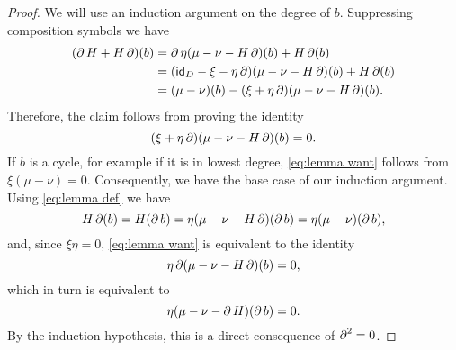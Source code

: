 \begin{proof}
	We will use an induction argument on the degree of $b$.
	Suppressing composition symbols we have
	\begin{align*}
		(\operatorname{\partial} H + H \operatorname{\partial})(b)
		&= \operatorname{\partial} \eta(\mu - \nu - H \operatorname{\partial})(b) + H \operatorname{\partial} (b) \\
		&= (\mathsf{id}_D - \xi - \eta \operatorname{\partial})(\mu - \nu - H \operatorname{\partial})(b) + H \operatorname{\partial}(b) \\
		&= (\mu-\nu)(b) - (\xi + \eta \operatorname{\partial})(\mu - \nu - H \operatorname{\partial})(b).
	\end{align*}
	Therefore, the claim follows from proving the identity
	\begin{equation}\label{eq:lemma want}
		(\xi + \eta \operatorname{\partial})(\mu - \nu - H \operatorname{\partial})(b) = 0.
	\end{equation}
	If $b$ is a cycle, for example if it is in lowest degree, \eqref{eq:lemma want} follows from $\xi(\mu-\nu) = 0$.
	Consequently, we have the base case of our induction argument.
	Using \eqref{eq:lemma def} we have
	\[
	H\operatorname{\partial} (b) = H(\operatorname{\partial} b) = \eta(\mu-\nu-H\operatorname{\partial})(\operatorname{\partial} b) = \eta(\mu-\nu)(\operatorname{\partial} b),
	\]
	and, since $\xi \eta = 0$, \eqref{eq:lemma want} is equivalent to the identity
	\[
	\eta \operatorname{\partial} (\mu-\nu - H\operatorname{\partial})(b) = 0,
	\]
	which in turn is equivalent to
	\[
	\eta (\mu-\nu - \operatorname{\partial} H)(\operatorname{\partial} b) = 0.
	\]
	By the induction hypothesis, this is a direct consequence of $\operatorname{\partial}^2 = 0$.
\end{proof}

